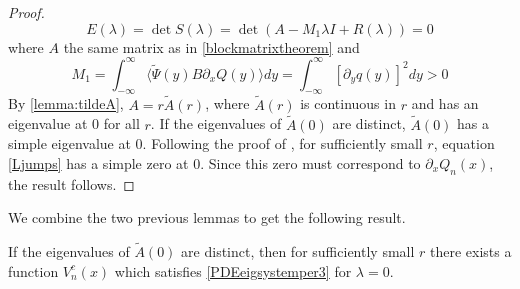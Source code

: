 \documentclass[thesis.tex]{subfiles}
\begin{document}
\begin{lemma}
\begin{proof}
\begin{equation}
E(\lambda) = \det S(\lambda) = \det( A - M_1 \lambda I + R(\lambda)) = 0
\end{equation}
where $A$ the same matrix as in \cref{blockmatrixtheorem} and
\[
M_1 = 
\int_{-\infty}^\infty \langle \tilde{\Psi}(y) B \partial_x Q(y) \rangle dy =  
\int_{-\infty}^\infty [\partial_y q(y)]^2 dy > 0
\]
By \cref{lemma:tildeA}, $A = r \tilde{A}(r)$, where $\tilde{A}(r)$ is continuous in $r$ and has an eigenvalue at 0 for all $r$. If the eigenvalues of $\tilde{A}(0)$ are distinct, $\tilde{A}(0)$ has a simple eigenvalue at 0. Following the proof of \cite[Theorem 3]{Sandstede1998}, for sufficiently small $r$, equation \cref{Ljumps} has a simple zero at 0. Since this zero must correspond to $\partial_x Q_n(x)$, the result follows.
\end{proof}
\end{lemma}

We combine the two previous lemmas to get the following result.

\begin{lemma}\label{lemma:centereigenfn}
If the eigenvalues of $\tilde{A}(0)$ are distinct, then for sufficiently small $r$ there exists a function $V_n^c(x)$ which satisfies \cref{PDEeigsystemper3} for $\lambda = 0$.
\end{lemma}

\iffulldocument\else
	
	
\fi
\end{document}
